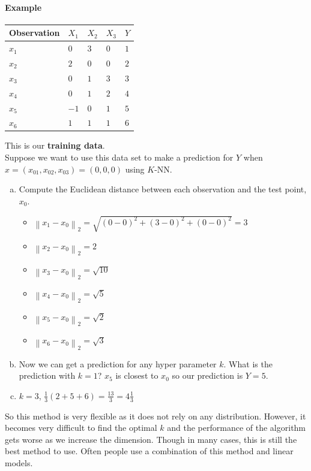 \documentclass[12 pt]{article}
\begin{document}
\paragraph{Example}
\begin{tabular}{l l l l l}
  \hline Observation& $X_1$& $X_2$&$X_3$&$Y$
  \\ \hline $x_1$ & $0$ & $3$ & $0$ & $1$
  \\ $x_2$ & $2$ & $0$ & $0$ & $2$
  \\ $x_3$ & $0$ & $1$ & $3$ & $3$
  \\ $x_4$ & $0$ & $1$ & $2$ & $4$
  \\ $x_5$ & $-1$ & $0$ & $1$ & $5$
  \\ $x_6$ & $1$ & $1$ & $1$ & $6$
\end{tabular} This is our \textbf{training data}.
\\ Suppose we want to use this data set to make a prediction for $Y$
when $x = (x_{01}, x_{02}, x_{03}) = (0, 0,0)$ using $K$-NN.\
\begin{enumerate}[(a)]
\item Compute the Euclidean distance between each observation and the
  test point, $x_0$.
  \begin{itemize}
  \item $\left\lVert x_1 - x_0 \right\rVert_2 = \sqrt{(0-0)^2 +
      (3-0)^2 + (0-0)^2} = 3$
  \item $\left\lVert x_2 - x_0 \right\rVert_2 = 2$
  \item $\left\lVert x_3 - x_0 \right\rVert_2 = \sqrt{10}$
  \item $\left\lVert x_4 - x_0 \right\rVert_2 = \sqrt{5}$
  \item $\left\lVert x_5 - x_0 \right\rVert_2 = \sqrt{2}$
  \item $\left\lVert x_6 - x_0 \right\rVert_2 = \sqrt{3}$
  \end{itemize}
\item Now we can get a prediction for any hyper parameter $k$. What is
  the prediction with $k = 1$? $x_5$ is closest to $x_0$ so our
  prediction is $Y = 5$.
\item $k = 3$, $\frac{1}{3} (2 + 5 + 6) = \frac{13}{3}= 4 \frac{1}{3}$
\end{enumerate}
So this method is very flexible as it does not rely on any
distribution. However, it becomes very difficult to find the optimal
$k$ and the performance of the algorithm gets worse as we increase the
dimension. Though in many cases, this is still the best method to
use. Often people use a combination of this method and linear models.
\end{document}
